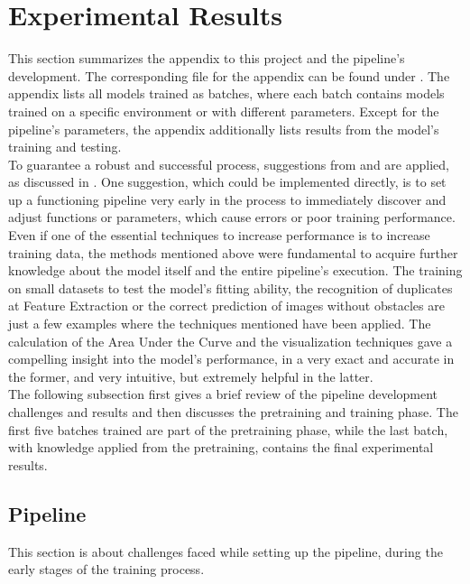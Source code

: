 \section{Experimental Results \label{ExperimentalResults} }
This section summarizes the appendix to this project and the pipeline's development. The corresponding file for the appendix can be found under . The appendix lists all models trained as batches, where each batch contains models trained on a specific environment or with different parameters. Except for the pipeline's parameters, the appendix additionally lists results from the model's training and testing.\\

To guarantee a robust and successful process, suggestions from \cite{Goodfellow-et-al-2016} and \cite{DBLP:journals/corr/abs-1803-09820} are applied, as  discussed in .  
One suggestion, which could be implemented directly, is to set up a functioning pipeline very early in the process to immediately discover and adjust functions or parameters, which cause errors or poor training performance. Even if one of the essential techniques to increase performance is to increase training data, the methods mentioned above were fundamental to acquire further knowledge about the model itself and the entire pipeline's execution. The training on small datasets to test the model's fitting ability, the recognition of duplicates at Feature Extraction or the correct prediction of images without obstacles are just a few examples where the techniques mentioned have been applied. The calculation of the Area Under the Curve and the visualization techniques gave a compelling insight into the model's performance, in a very exact and accurate in the former, and very intuitive, but extremely helpful in the latter.\\


The following subsection first gives a brief review of the pipeline development challenges and results and then discusses the pretraining and training phase. The first five batches trained are part of the pretraining phase, while the last batch, with knowledge applied from the pretraining, contains the final experimental results.

\subsection{Pipeline \label{pipeline}}
This section is about challenges faced while setting up the pipeline, during the early stages of the training process.\\

